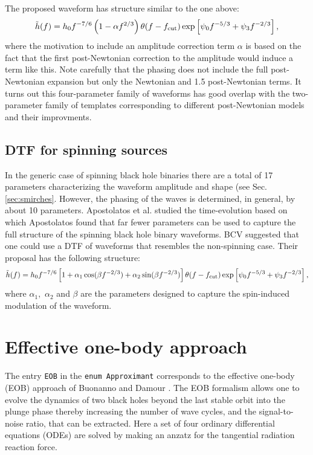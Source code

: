  The proposed waveform has structure similar to the one above: 
 \begin{equation}
 \tilde h(f) = h_0 f^{-7/6} \left (1 - \alpha f^{2/3} \right) \theta(f-f_{\rm cut}) 
 \exp \left [ \psi_0 f^{-5/3} + \psi_3 f^{-2/3} \right ],
\label{eq:BCV:NonSpinning}
 \end{equation}
 where the motivation to include an amplitude correction term $\alpha$ is based on the
 fact that the first post-Newtonian correction to the amplitude would induce a term like this.
 Note carefully that the phasing does not include the full post-Newtonian expansion 
 but only the Newtonian and 1.5 post-Newtonian terms. It turns out this four-parameter
 family of waveforms has good overlap with the two-parameter family of templates
 corresponding to different post-Newtonian models and their improvments.

\subsection{DTF for spinning sources}
In the generic case of spinning black hole binaries there are a total of 17
parameters characterizing the waveform amplitude and shape 
(see Sec.\ref{sec:smirches}.  However, the phasing
of the waves is determined, in general, by about 10 parameters. Apostolatos
et al. \cite {ACST94} studied the time-evolution based on which Apostolatos
found \cite{TAA96} that far fewer parameters can be used to capture 
the full structure of the spinning black hole binary
waveforms. BCV suggested \cite{BCV03b} that one could use a DTF of waveforms that resembles
the non-spinning case. Their proposal has the following structure:
\begin{equation}
\tilde h(f) = h_0 f^{-7/6} 
\left [1 + \alpha_1 \cos ( \beta f^{-2/3} ) 
         + \alpha_2 \sin ( \beta f^{-2/3} ) \right] 
\theta(f-f_{\rm cut}) 
 \exp \left [ \psi_0 f^{-5/3} + \psi_3 f^{-2/3} \right ],
\label{eq:BCV:Spinning}
\end{equation}
where $\alpha_1,$ $\alpha_2$ and $\beta$ are the parameters designed
to capture the spin-induced modulation of the waveform. 

\section{Effective one-body approach}
\label{sec:EOB}
\newcommand{\ww}{\widehat{\omega}}
\newcommand{\wF}{\widehat{\cal F}}
The entry \texttt{EOB} in the {\tt enum Approximant} corresponds to the 
effective one-body (EOB) approach of Buonanno and Damour 
\cite{BD99,BD00,DJS00,TD02}. The EOB formalism allows one to evolve 
the dynamics of two black holes beyond the last stable orbit into 
the plunge phase thereby increasing the number of
wave cycles, and the signal-to-noise ratio, that can be extracted.
Here a set of four ordinary differential equations (ODEs) are solved 
by making an anzatz for the tangential radiation reaction force. 

